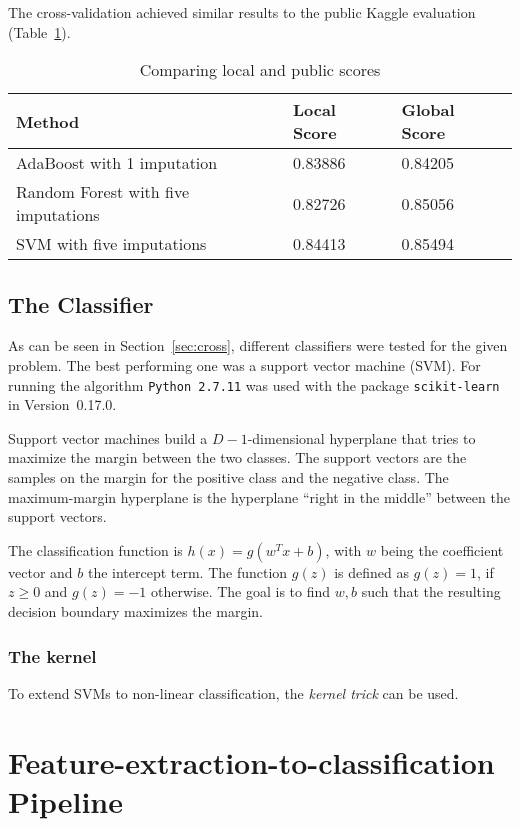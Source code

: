 \documentclass{article}
\begin{document}
The cross-validation achieved similar results to the public
Kaggle evaluation (Table~\ref{tab:localpublic}). 

\begin{table}[H]
  \centering
  \begin{tabular}{lll}
    \toprule
    Method & Local Score & Global Score\\
    \midrule
    AdaBoost with 1 imputation & 0.83886 & 0.84205\\
    Random Forest with five imputations & 0.82726 & 0.85056\\
    SVM with five imputations & 0.84413 & 0.85494\\
    \bottomrule
  \end{tabular}
  \caption{Comparing local and public scores}
  \label{tab:localpublic}
\end{table}

\subsection{The Classifier}

As can be seen in Section~\ref{sec:cross}, different classifiers were
tested for the given problem. The best performing one was a support
vector machine (SVM). For running the algorithm \texttt{Python~2.7.11}
was used with the package \texttt{scikit-learn} in Version~0.17.0.

Support vector machines build a $D-1$-dimensional hyperplane that
tries to maximize the margin between the two classes. The support
vectors are the samples on the margin for the positive class and the
negative class. The maximum-margin hyperplane is the hyperplane
``right in the middle'' between the support vectors.

The classification function is $h(x) = g(w^Tx + b)$, with $w$ being
the coefficient vector and $b$ the intercept term. The function $g(z)$
is defined as $g(z) = 1$, if $z \geq 0$ and $g(z) = -1$ otherwise. The
goal is to find $w, b$ such that the resulting decision boundary
maximizes the margin.

\subsubsection{The kernel}
\label{sec:kernel}

To extend SVMs to non-linear classification, the \emph{kernel trick}
can be used.

\section{Feature-extraction-to-classification Pipeline}
\end{document}
